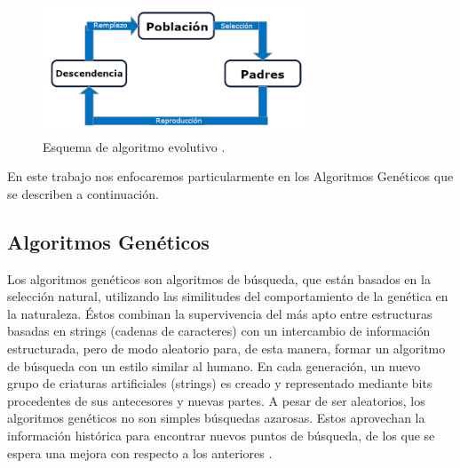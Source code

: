 \begin{figure}
	\centering
	\includegraphics[width=8cm]{imagenes/esquema_evolutivo.png}
	\caption{Esquema de algoritmo evolutivo \cite{grosan2011intelligent}.}
	\label{fig:esquema_evolutivo}
\end{figure}


En este trabajo nos enfocaremos particularmente en  los  Algoritmos Genéticos que se describen a  continuación. 
\subsection{Algoritmos Genéticos}
\label{sec:algoritmos_geneticos}
Los algoritmos genéticos son algoritmos de búsqueda, que  están basados en la selección natural,  utilizando las similitudes del comportamiento de la genética en la naturaleza. Éstos combinan la supervivencia del más apto entre estructuras basadas en strings (cadenas de caracteres) con un intercambio de información estructurada, pero de modo aleatorio para, de esta manera, formar un algoritmo de búsqueda con un estilo similar al humano. En cada generación, un nuevo grupo de criaturas artificiales (strings) es creado y representado mediante bits procedentes de sus antecesores y nuevas partes. A pesar de ser aleatorios, los algoritmos genéticos no son simples búsquedas azarosas. Estos aprovechan la información histórica para encontrar nuevos puntos de búsqueda, de los que se espera una mejora con respecto a los anteriores \cite{goldberg1989genetic}.

